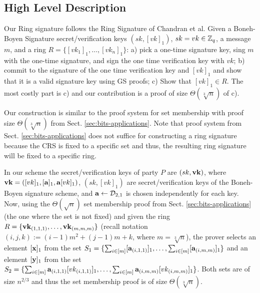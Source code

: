 \subsection{High Level Description}

Our Ring signature follows the Ring Signature of Chandran et al. Given a Boneh-Boyen Signature secret/verification keys $(sk,[vk]_1)$, $sk=vk\in\mathbb{Z}_q$, a message $m$, and a ring $R=\{[vk_1]_1,\ldots,[vk_n]_1\}$: a) pick a one-time signature key, sing $m$ with the one-time signature, and sign the one time verification key with $vk$; b) commit to the signature of the one time verification key and $[vk]_1$ and show that it is a valid signature key using GS proofs; c) Show that $[vk]_1\in R$. The most costly part is c) and our contribution is a proof of size $\Theta(\sqrt[3]{n})$ of c).

Our construction is similar to the proof system for set membership with proof size $\Theta(\sqrt[3]{n})$ from Sect. \ref{sec:bits-applications}. Note that proof system from Sect. \ref{sec:bits-applications} does not suffice for constructing a ring signature because the CRS is fixed to a specific set and thus, the resulting ring signature will be fixed to a specific ring. 



In our scheme the secret/verification keys of party $P$ are $(sk,\mathbf{vk})$, where $\mathbf{vk}=([vk]_1,[\mathbf{a}]_1,\mathbf{a}[vk]_1)$, $(sk,[vk]_1)$ are secret/verification keys of the Boneh-Boyen signature scheme, and $\mathbf{a}\gets\mathcal{D}_{2,1}$ is chosen independently for each key. Now, using the $\Theta(\sqrt{n})$ set membership proof from Sect. \ref{sec:bits-applications} (the one where the set is not fixed) and given the ring $R=\{\mathbf{vk}_{(1,1,1)},\ldots,\mathbf{vk}_{(m,m,m)}\}$ (recall notation $(i,j,k):=(i-1)m^2+(j-1)m+k$, where $m=\sqrt[3]{n}$), the prover selects an element $[\mathbf{x}]_1$ from the set $S_1=\{\sum_{i\in[m]}[\mathbf{a}_{(i,1,1)}]_1,\ldots,\sum_{i\in[m]}[\mathbf{a}_{(i,m,m)}]_1\}$ and an element $[\mathbf{y}]_1$ from the set $S_2=\{\sum_{i\in[m]}\mathbf{a}_{(i,1,1)}[vk_{(i,1,1)}]_1,\ldots,\sum_{i\in[m]}\mathbf{a}_{(i,m,m)}[vk_{(i,m,m)}]_1\}$. Both sets are of size $n^{2/3}$ and thus the set membership proof is of size $\Theta(\sqrt[3]{n})$.

